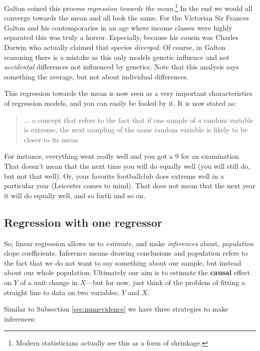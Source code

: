\documentclass[
]{book}
\begin{document}
Galton coined this process \emph{regression towards the mean}.\footnote{Modern statisticians actually see this as a form of shrinkage.} In the end we would all converge towards the mean and all look the same. For the Victorian Sir Frances Galton and his contemporaries in an age where income classes were highly separated this was truly a horror. Especially, because his cousin was Charles Darwin who actually claimed that species \emph{diverged}. Of course, in Galton reasoning there is a mistake as this only models genetic influence and not \emph{accidental} differences not influenced by genetics. Note that this analysis says something the average, but not about individual differences.

This regression towards the mean is now seen as a very important characteristics of regression models, and you can easily be fooled by it. It is now stated as:

\begin{quote}
\(\ldots\) a concept that refers to the fact that if one sample of a random variable is extreme, the next sampling of the same random variable is likely to be closer to its mean
\end{quote}

For instance, everything went really well and you got a 9 for an examination. That doesn't mean that the next time you will do equally well (you will still do, but not that well). Or, your favorite footballclub does extreme well in a particular year (Leicester comes to mind). That does not mean that the next year it will do equally well, and so forth and so on.

\hypertarget{regression-with-one-regressor}{%
\subsection{Regression with one regressor}\label{regression-with-one-regressor}}

So, linear regression allows us to \emph{estimate}, and make \emph{inferences} about, \emph{population} slope coefficients. Inference means drawing conclusions and population refers to the fact that we do not want to say something about our sample, but instead about our whole population. Ultimately our aim
is to estimate the \textbf{causal} effect on \(Y\) of a unit change in \(X\)---but for now, just think of the problem of fitting a straight line to data on two variables, \(Y\) and \(X\).

Similar to Subsection \ref{sec:numevidence} we have three strategies to make inferences:
\end{document}
